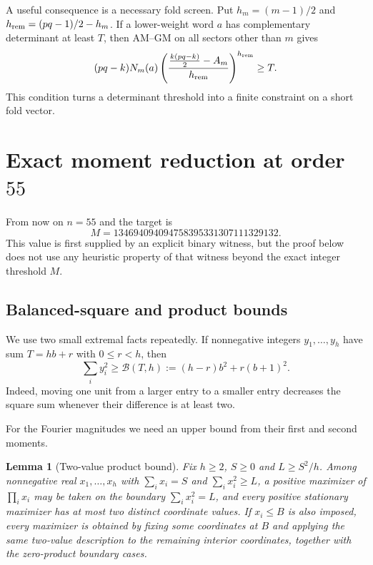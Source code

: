 \documentclass[11pt,a4paper]{article}
\newtheorem{lemma}[theorem]{Lemma}
\theoremstyle{definition}
\theoremstyle{remark}
\newcommand{\M}{134694094094758395331307111329132}
\begin{document}
A useful consequence is a necessary fold screen.  Put
$h_m=(m-1)/2$ and $h_{\rm rem}=(pq-1)/2-h_m$.  If a lower-weight word $a$
has complementary determinant at least $T$, then AM--GM on all sectors other
than $m$ gives
\begin{equation}
\label{eq:fold-necessary}
  (pq-k)N_m(a)
  \left(\frac{\frac{k(pq-k)}2-A_m}{h_{\rm rem}}\right)^{h_{\rm rem}}
  \ge T.
\end{equation}
This condition turns a determinant threshold into a finite constraint on a
short fold vector.

\section{Exact moment reduction at order \texorpdfstring{$55$}{55}}
\label{sec:moment55}

From now on $n=55$ and the target is
\[
  M=\M.
\]
This value is first supplied by an explicit binary witness, but the proof below
does not use any heuristic property of that witness beyond the exact integer
threshold $M$.

\subsection{Balanced-square and product bounds}

We use two small extremal facts repeatedly.  If nonnegative integers
$y_1,\ldots,y_h$ have sum $T=hb+r$ with $0\le r<h$, then
\begin{equation}
\label{eq:balanced-square}
  \sum_i y_i^2\ge \mathcal B(T,h):=(h-r)b^2+r(b+1)^2.
\end{equation}
Indeed, moving one unit from a larger entry to a smaller entry decreases the
square sum whenever their difference is at least two.

For the Fourier magnitudes we need an upper bound from their first and second
moments.

\begin{lemma}[Two-value product bound]
\label{lem:two-value}
Fix $h\ge2$, $S\ge0$ and $L\ge S^2/h$.  Among nonnegative real
$x_1,\ldots,x_h$ with $\sum_i x_i=S$ and $\sum_i x_i^2\ge L$, a positive
maximizer of $\prod_i x_i$ may be taken on the boundary
$\sum_i x_i^2=L$, and every positive stationary maximizer has at most two
distinct coordinate values.  If $x_i\le B$ is also imposed, every maximizer is
obtained by fixing some coordinates at $B$ and applying the same two-value
description to the remaining interior coordinates, together with the
zero-product boundary cases.
\end{lemma}
\end{document}
